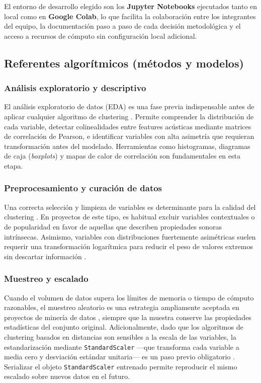 El entorno de desarrollo elegido son los \textbf{Jupyter Notebooks} ejecutados tanto en local como en \textbf{Google Colab}, lo que facilita la colaboración entre los integrantes del equipo, la documentación paso a paso de cada decisión metodológica y el acceso a recursos de cómputo sin configuración local adicional.

\subsection{Referentes algorítmicos (métodos y modelos)}

\subsubsection{Análisis exploratorio y descriptivo}

El análisis exploratorio de datos (EDA) es una fase previa indispensable antes de aplicar cualquier algoritmo de clustering \cite{han2011data}. Permite comprender la distribución de cada variable, detectar colinealidades entre features acústicas mediante matrices de correlación de Pearson, e identificar variables con alta asimetría que requieran transformación antes del modelado. Herramientas como histogramas, diagramas de caja (\textit{boxplots}) y mapas de calor de correlación son fundamentales en esta etapa.

\subsubsection{Preprocesamiento y curación de datos}

Una correcta selección y limpieza de variables es determinante para la calidad del clustering \cite{han2011data}. En proyectos de este tipo, es habitual excluir variables contextuales o de popularidad en favor de aquellas que describen propiedades sonoras intrínsecas. Asimismo, variables con distribuciones fuertemente asimétricas suelen requerir una transformación logarítmica para reducir el peso de valores extremos sin descartar información \cite{vanderplas2016python}.

\subsubsection{Muestreo y escalado}

Cuando el volumen de datos supera los límites de memoria o tiempo de cómputo razonables, el muestreo aleatorio es una estrategia ampliamente aceptada en proyectos de minería de datos \cite{han2011data}, siempre que la muestra conserve las propiedades estadísticas del conjunto original. Adicionalmente, dado que los algoritmos de clustering basados en distancias son sensibles a la escala de las variables, la estandarización mediante \texttt{StandardScaler} ---que transforma cada variable a media cero y desviación estándar unitaria--- es un paso previo obligatorio \cite{pedregosa2011scikit}. Serializar el objeto \texttt{StandardScaler} entrenado permite reproducir el mismo escalado sobre nuevos datos en el futuro.

